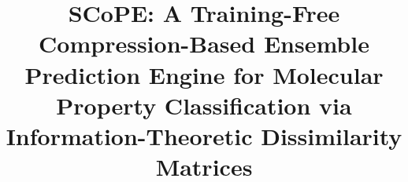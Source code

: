 \documentclass[pdflatex,sn-mathphys-num]{sn-jnl}
\theoremstyle{thmstyleone}
\theoremstyle{thmstyletwo}
\theoremstyle{thmstylethree}
\begin{document}
\title[SCoPE: Compression-Based Molecular Classification]{%
SCoPE: A Training-Free Compression-Based Ensemble Prediction Engine for Molecular Property Classification via Information-Theoretic Dissimilarity Matrices}

\author[1]{ }
\author[1]{ }
\author*[1]{ }


\end{document}
